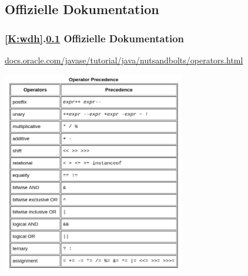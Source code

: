 \documentclass[c,18pt]{beamer}
\begin{document}
\def\stitle{Offizielle Dokumentation}
\subsection{\stitle}\label{S:Dokumentation}
\begin{frame}[fragile]%
  \frametitle{\ref{K:wdh}.\ref{S:Dokumentation} \stitle}%
\textcolor{KITblue}{\url{docs.oracle.com/javase/tutorial/java/nutsandbolts/operators.html}}

\begin{center}
\includegraphics[width=0.6\textwidth]{grundl-boolalgnegation/operatorPrecedence}
\end{center}
\end{frame}


\def\stitle{De Morgansche Gesetze}
\end{document}
